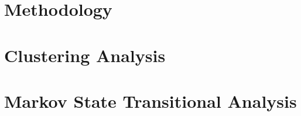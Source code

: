 









\section{Methodology}



\section{Clustering Analysis}

\section{Markov State Transitional Analysis}






